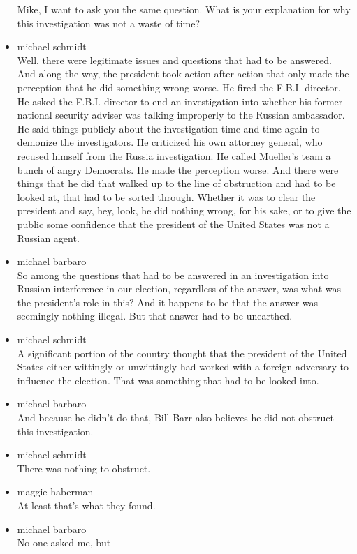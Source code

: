 \begin{itemize}
  Mike, I want to ask you the same question. What is your explanation
  for why this investigation was not a waste of time?
\item
  michael schmidt\\
  Well, there were legitimate issues and questions that had to be
  answered. And along the way, the president took action after action
  that only made the perception that he did something wrong worse. He
  fired the F.B.I. director. He asked the F.B.I. director to end an
  investigation into whether his former national security adviser was
  talking improperly to the Russian ambassador. He said things publicly
  about the investigation time and time again to demonize the
  investigators. He criticized his own attorney general, who recused
  himself from the Russia investigation. He called Mueller's team a
  bunch of angry Democrats. He made the perception worse. And there were
  things that he did that walked up to the line of obstruction and had
  to be looked at, that had to be sorted through. Whether it was to
  clear the president and say, hey, look, he did nothing wrong, for his
  sake, or to give the public some confidence that the president of the
  United States was not a Russian agent.
\item
  michael barbaro\\
  So among the questions that had to be answered in an investigation
  into Russian interference in our election, regardless of the answer,
  was what was the president's role in this? And it happens to be that
  the answer was seemingly nothing illegal. But that answer had to be
  unearthed.
\item
  michael schmidt\\
  A significant portion of the country thought that the president of the
  United States either wittingly or unwittingly had worked with a
  foreign adversary to influence the election. That was something that
  had to be looked into.
\item
  michael barbaro\\
  And because he didn't do that, Bill Barr also believes he did not
  obstruct this investigation.
\item
  michael schmidt\\
  There was nothing to obstruct.
\item
  maggie haberman\\
  At least that's what they found.
\item
  michael barbaro\\
  No one asked me, but ---

\end{itemize}
